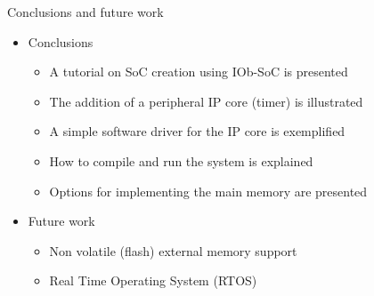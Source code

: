 \documentclass [xcolor=svgnames, t] {beamer}
\begin{document}
\begin{frame}{Conclusions and future work}

\begin{itemize}
  \item Conclusions
    \begin{itemize}
    \item A tutorial on SoC creation using IOb-SoC is presented
    \item The addition of a peripheral IP core (timer) is illustrated
    \item A simple software driver for the IP core is exemplified
    \item How to compile and run the system is explained 
    \item Options for implementing the main memory are presented
    \end{itemize}
  \item Future work
    \begin{itemize}
    \item Non volatile (flash) external memory support
    \item Real Time Operating System (RTOS) 
    \end{itemize}
\end{itemize}

\end{frame}

\end{document}
